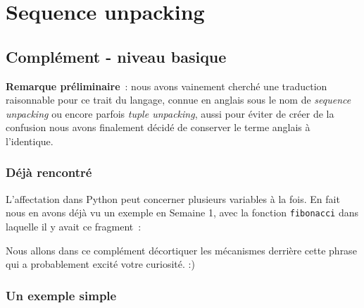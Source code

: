     
    
    
    

    

    \hypertarget{sequence-unpacking}{%
\section{Sequence unpacking}\label{sequence-unpacking}}

    \hypertarget{compluxe9ment---niveau-basique}{%
\subsection{Complément - niveau
basique}\label{compluxe9ment---niveau-basique}}

    \textbf{Remarque préliminaire}~: nous avons vainement cherché une
traduction raisonnable pour ce trait du langage, connue en anglais sous
le nom de \emph{sequence unpacking} ou encore parfois \emph{tuple
unpacking}, aussi pour éviter de créer de la confusion nous avons
finalement décidé de conserver le terme anglais à l'identique.

    \hypertarget{duxe9juxe0-rencontruxe9}{%
\subsubsection{Déjà rencontré}\label{duxe9juxe0-rencontruxe9}}

    L'affectation dans Python peut concerner plusieurs variables à la fois.
En fait nous en avons déjà vu un exemple en Semaine 1, avec la fonction
\texttt{fibonacci} dans laquelle il y avait ce fragment~:

\begin{Shaded}
\begin{Highlighting}[frame=lines,framerule=0.6mm,rulecolor=\color{asisframecolor}]
 \NormalTok{(}\OperatorTok{+} \NormalTok{):}
\OperatorTok{=}\OperatorTok{+}
\end{Highlighting}
\end{Shaded}

Nous allons dans ce complément décortiquer les mécanismes derrière cette
phrase qui a probablement excité votre curiosité. :)

    \hypertarget{un-exemple-simple}{%
\subsubsection{Un exemple simple}\label{un-exemple-simple}}

